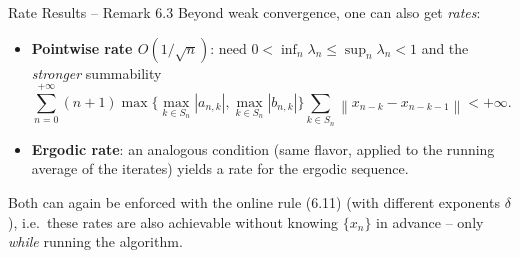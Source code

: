 \documentclass[aspectratio=169,10pt]{beamer}
\newcommand{\norm}[1]{\left\|#1\right\|}
\begin{document}
\begin{frame}{Rate Results -- Remark 6.3}
Beyond weak convergence, one can also get \emph{rates}:
\begin{itemize}
\item \textbf{Pointwise rate $O(1/\sqrt n)$}: need
$0<\inf_n\lambda_n\le\sup_n\lambda_n<1$ and the \emph{stronger}
summability
\[
\sum_{n=0}^{+\infty}(n+1)\max\Big\{\max_{k\in S_n}|a_{n,k}|,\max_{k\in S_n}|b_{n,k}|\Big\}
\sum_{k\in S_n}\norm{x_{n-k}-x_{n-k-1}} < +\infty.
\]
\item \textbf{Ergodic rate}: an analogous condition (same flavor, applied
to the running average of the iterates) yields a rate for the ergodic
sequence.
\end{itemize}
Both can again be enforced with the online rule (6.11) (with different
exponents $\delta$), i.e.\ these rates are also achievable without knowing
$\{x_n\}$ in advance -- only \emph{while} running the algorithm.
\end{frame}
\end{document}
